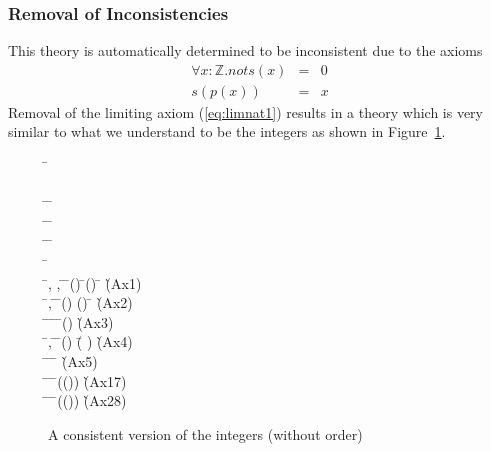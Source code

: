 \subsubsection{Removal of Inconsistencies}
This theory is automatically determined to be inconsistent due to the axioms
\begin{eqnarray}
\forall x : \mathbb{Z} . not s(x) &=& 0 \label{eq:limnat1}\\
s(p(x)) &=& x \label{eq:sucpre}
\end{eqnarray}
Removal of the limiting axiom (\ref{eq:limnat1}) results in a theory which is very
similar to what we understand to be the integers as shown in Figure~\ref{fig:integers}.
\begin{figure}[!ht]
\begin{hetcasl}
\SPEC \= \Ax{=}\\
\> \SORT {}\\
\> \OP \=\Ax{\_\_}\Ax{+}\Ax{\_\_} \Ax{:} \= \Ax{\times}  \Ax{\rightarrow} \\
\> \OP \= \Ax{:} \= \Ax{\rightarrow} \\
\> \OP \= \Ax{:} \= \Ax{\rightarrow} \\
\> \OP \= \Ax{:} \\
\> \Ax{\forall} \=, ,  \Ax{:}  \=\Ax{\bullet} \=() \Ax{=}  \Ax{\wedge} \=() \Ax{=}  \Ax{\Rightarrow} \= \Ax{=}  \`{\small{}\KW{\%}(Ax1)\KW{\%}}\\
\> \Ax{\forall} \=,  \Ax{:}  \=\Ax{\bullet} \=() \Ax{=} () \Ax{\Rightarrow} \= \Ax{=}  \`{\small{}\KW{\%}(Ax2)\KW{\%}}\\
\> \Ax{\forall} \= \Ax{:}  \=\Ax{\bullet} \=\Ax{\exists}  \Ax{:}  \Ax{\bullet} \=() \Ax{=}  \`{\small{}\KW{\%}(Ax3)\KW{\%}}\\
\> \Ax{\forall} \=,  \Ax{:}  \=\Ax{\bullet} \=() \Ax{+}  \Ax{=} (\= \Ax{+} ) \`{\small{}\KW{\%}(Ax4)\KW{\%}}\\
\> \Ax{\forall} \= \Ax{:}  \=\Ax{\bullet} \= \Ax{+}  \Ax{=}  \`{\small{}\KW{\%}(Ax5)\KW{\%}}\\
\> \Ax{\forall} \= \Ax{:}  \=\Ax{\bullet} \=(()) \Ax{=}  \`{\small{}\KW{\%}(Ax1\Ax{\_}7)\KW{\%}}\\
\> \Ax{\forall} \= \Ax{:}  \=\Ax{\bullet} \=(()) \Ax{=}  \`{\small{}\KW{\%}(Ax2\Ax{\_}8)\KW{\%}}\\
\end{hetcasl}
\caption{A consistent version of the integers (without order)}
\label{fig:integers}
\end{figure}


